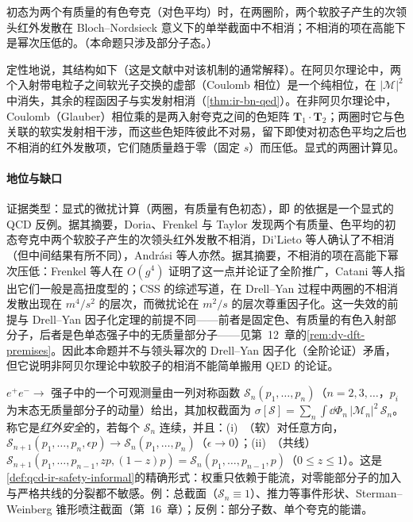 \begin{proposition}\label{prop:ir-bn-failure}
初态为两个有质量的有色夸克（对色平均）时，在两圈阶，两个软胶子产生的次领头红外发散在 Bloch--Nordsieck 意义下的单举截面中不相消；不相消的项在高能下是幂次压低的。（本命题只涉及部分子态。）
\end{proposition}
\begin{proofsketch}
定性地说，其结构如下（这是文献中对该机制的通常解释）。在阿贝尔理论中，两个入射带电粒子之间软光子交换的虚部（Coulomb 相位）是一个纯相位，在 $|\mathcal M|^2$ 中消失，其余的程函因子与实发射相消（\cref{thm:ir-bn-qed}）。在非阿贝尔理论中，Coulomb（Glauber）相位乘的是两入射夸克之间的色矩阵 $\mathbf T_1\cdot\mathbf T_2$；两圈时它与色关联的软实发射相干涉，而这些色矩阵彼此不对易，留下即使对初态色平均之后也不相消的红外发散项，它们随质量趋于零（固定 $s$）而压低。显式的两圈计算见\cite{DoriaFrenkelTaylor1980,DiLietoEtAl1981,Andrasi:1980qw}。
\end{proofsketch}

\paragraph{地位与缺口}
证据类型：显式的微扰计算（两圈，有质量有色初态），即 \tagV 的依据是一个显式的 QCD 反例。据其摘要，Doria、Frenkel 与 Taylor 发现两个有质量、色平均的初态夸克中两个软胶子产生的次领头红外发散不相消\cite{DoriaFrenkelTaylor1980}，Di'Lieto 等人确认了不相消（但中间结果有所不同）\cite{DiLietoEtAl1981}，Andrási 等人亦然\cite{Andrasi:1980qw}。据其摘要，不相消的项在高能下幂次压低：Frenkel 等人在 $O(g^4)$ 证明了这一点并论证了全阶推广\cite{Frenkel:1983di}，Catani 等人指出它们一般是高扭度型的\cite{Catani:1985xt}；CSS 的综述写道，在 Drell--Yan 过程中两圈的不相消发散出现在 $m^4/s^2$ 的层次，而微扰论在 $m^2/s$ 的层次尊重因子化\cite[第~10.2~节]{CollinsSoperSterman1989}。这一失效的前提与 Drell--Yan 因子化定理的前提不同——前者是固定色、有质量的有色入射部分子，后者是色单态强子中的无质量部分子——见第~12~章的\cref{rem:dy-dft-premises}。因此本命题并不与领头幂次的 Drell--Yan 因子化（全阶论证）矛盾，但它说明非阿贝尔理论中软胶子的相消不能简单搬用 QED 的论证。

\begin{definition}[红外安全可观测量]\label{def:ir-safe}
$e^+e^-\to$ 强子中的一个可观测量由一列对称函数 $\mathcal S_n(p_1,\dots,p_n)$（$n=2,3,\dots$，$p_i$ 为末态无质量部分子的动量）给出，其加权截面为 $\sigma[\mathcal S]=\sum_n\int\dd\Phi_n\,|\mathcal M_n|^2\,\mathcal S_n$。称它是\emph{红外安全}的，若每个 $\mathcal S_n$ 连续，并且：(i)~（软）对任意方向，$\mathcal S_{n+1}(p_1,\dots,p_n,\epsilon p)\to\mathcal S_n(p_1,\dots,p_n)$（$\epsilon\to0$）；(ii)~（共线）$\mathcal S_{n+1}(p_1,\dots,p_{n-1},zp,(1-z)p)=\mathcal S_n(p_1,\dots,p_{n-1},p)$（$0\le z\le1$）。这是\cref{def:qcd-ir-safety-informal}的精确形式：权重只依赖于能流，对零能部分子的加入与严格共线的分裂都不敏感。例：总截面（$\mathcal S_n\equiv1$）、推力等事件形状、Sterman--Weinberg 锥形喷注截面（第~16~章）；反例：部分子数、单个夸克的能谱。
\end{definition}

